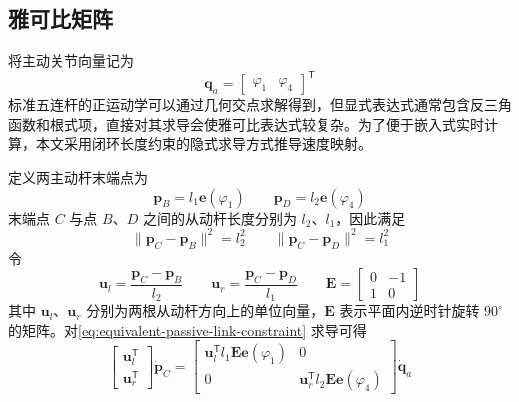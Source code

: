 \subsection{雅可比矩阵}

将主动关节向量记为
\begin{equation}
  \boldsymbol{q}_a =
  \begin{bmatrix}
    \varphi_1 & \varphi_4
  \end{bmatrix}^{\mathsf{T}}
  \label{eq:active-joint-vector-ch3}
\end{equation}
标准五连杆的正运动学可以通过几何交点求解得到，但显式表达式通常包含反三角函数和根式项，直接对其求导会使雅可比表达式较复杂。为了便于嵌入式实时计算，本文采用闭环长度约束的隐式求导方式推导速度映射。

定义两主动杆末端点为
\begin{equation}
  \boldsymbol{p}_B = l_1\boldsymbol{e}(\varphi_1)
  \qquad
  \boldsymbol{p}_D = l_2\boldsymbol{e}(\varphi_4)
  \label{eq:fivebar-active-endpoints}
\end{equation}
末端点 $C$ 与点 $B$、$D$ 之间的从动杆长度分别为 $l_2$、$l_1$，因此满足
\begin{equation}
  \| \boldsymbol{p}_C - \boldsymbol{p}_B \|^2 = l_2^2
  \qquad
  \| \boldsymbol{p}_C - \boldsymbol{p}_D \|^2 = l_1^2
  \label{eq:equivalent-passive-link-constraint}
\end{equation}
令
\begin{equation}
  \boldsymbol{u}_l = \frac{\boldsymbol{p}_C-\boldsymbol{p}_B}{l_2}
  \qquad
  \boldsymbol{u}_r = \frac{\boldsymbol{p}_C-\boldsymbol{p}_D}{l_1}
  \qquad
  \boldsymbol{E} =
  \begin{bmatrix}
    0 & -1 \\
    1 & 0
  \end{bmatrix}
  \label{eq:equivalent-passive-unit-vectors}
\end{equation}
其中 $\boldsymbol{u}_l$、$\boldsymbol{u}_r$ 分别为两根从动杆方向上的单位向量，$\boldsymbol{E}$ 表示平面内逆时针旋转 $90^\circ$ 的矩阵。对\eqref{eq:equivalent-passive-link-constraint} 求导可得
\begin{equation}
  \begin{bmatrix}
    \boldsymbol{u}_l^\mathsf{T} \\
    \boldsymbol{u}_r^\mathsf{T}
  \end{bmatrix}
  \dot{\boldsymbol{p}}_C
  =
  \begin{bmatrix}
    \boldsymbol{u}_l^\mathsf{T} l_1\boldsymbol{E}\boldsymbol{e}(\varphi_1) & 0 \\
    0 & \boldsymbol{u}_r^\mathsf{T} l_2\boldsymbol{E}\boldsymbol{e}(\varphi_4)
  \end{bmatrix}
  \dot{\boldsymbol{q}}_a
  \label{eq:fivebar-implicit-velocity}
\end{equation}
